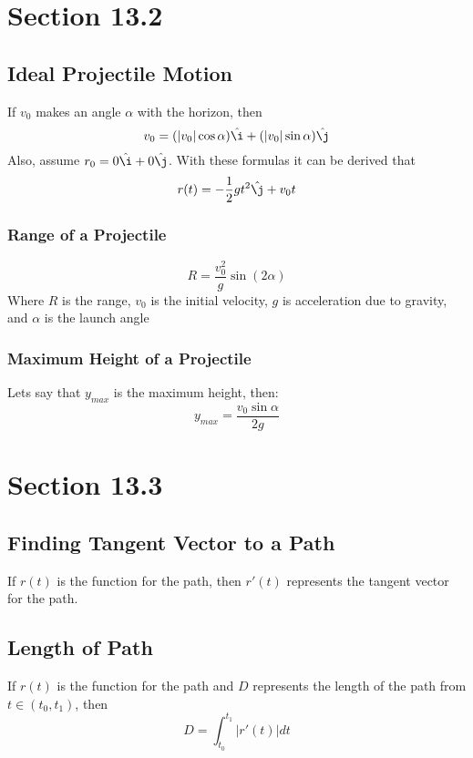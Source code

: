 \documentclass[../main.tex]{subfiles}
\begin{document}
\section{Section 13.2}

\subsection{Ideal Projectile Motion}
If $v_0$ makes an angle $\alpha$ with the horizon, then 
\begin{equation*}
v_0 = (|v_0|\cos \alpha){\ihat} + (|v_0|\sin \alpha){\jhat}
\end{equation*}
Also, assume $r_0 = 0{\ihat} + 0{\hat \j}$. With these formulas it can be derived that
\begin{equation*}
r(t) = -\frac12 gt^2 {\hat \j} + v_0t
\end{equation*}

\subsubsection{Range of a Projectile}
\begin{equation*}
R = \frac{v_0^2}{g} \sin (2\alpha)
\end{equation*}
Where $R$ is the range, $v_0$ is the initial velocity, $g$ is acceleration due to gravity, and 
$\alpha$ is the launch angle

\subsubsection{Maximum Height of a Projectile}
Lets say that $y_{max}$ is the maximum height, then:
\begin{equation*}
	y_{max} = \frac{v_0 \sin \alpha}{2g}
\end{equation*}

\section{Section 13.3}

\subsection{Finding Tangent Vector to a Path}
If $r(t)$ is the function for the path, then $r'(t)$ represents the tangent vector for the path.

\subsection{Length of Path}
If $r(t)$ is the function for the path and $D$ represents the length of the path from $t \in (t_0, t_1)$,
then 
\begin{equation*}
	D = \int_{t_0}^{t_1} |r'(t)|dt
\end{equation*}
\end{document}
